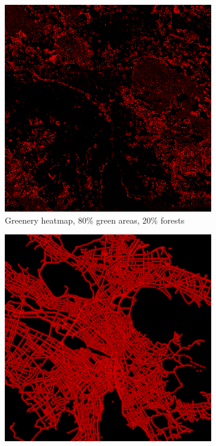\documentclass[letterpaper]{article}
\begin{document}
\begin{figure}[htb]
    \centering
    \begin{subfigure}[t]{.48\columnwidth}
        \centering
        \includegraphics[width=\linewidth]{images/greenery/combined_heatmap_4_to_1.png}
        \caption[width=.9\linewidth]{Greenery heatmap, 80\% green areas, 20\% forests}
    \end{subfigure}\hspace{0.03\columnwidth}
    \begin{subfigure}[t]{.48\columnwidth}
        \centering
        \includegraphics[width=\linewidth]{images/results/illumination_heatmap_70.png}

\end{subfigure}
\end{figure}
\end{document}

